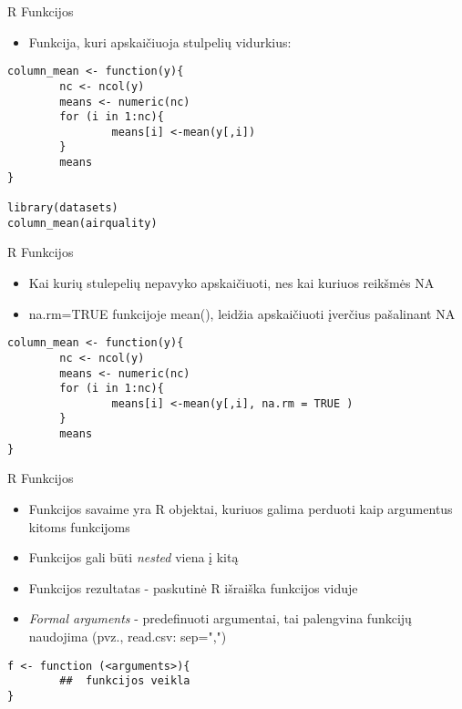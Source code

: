 \documentclass[11pt,xcolor=table]{beamer}
\begin{document}
\begin{frame}[fragile]{R Funkcijos}
\begin{itemize}
\item Funkcija, kuri apskaičiuoja stulpelių vidurkius:
\end{itemize}
\begin{lstlisting}
column_mean <- function(y){
        nc <- ncol(y)
        means <- numeric(nc)
        for (i in 1:nc){
                means[i] <-mean(y[,i])
        }
        means
}

library(datasets)
column_mean(airquality)
\end{lstlisting}
\end{frame}


\begin{frame}[fragile]{R Funkcijos}
\begin{itemize}
\item Kai kurių stulepelių nepavyko apskaičiuoti, nes kai kuriuos reikšmės NA
\item na.rm=TRUE funkcijoje mean(), leidžia apskaičiuoti įverčius pašalinant NA
\end{itemize}
\begin{lstlisting}
column_mean <- function(y){
        nc <- ncol(y)
        means <- numeric(nc)
        for (i in 1:nc){
                means[i] <-mean(y[,i], na.rm = TRUE )
        }
        means
}
\end{lstlisting}
\end{frame}


\begin{frame}[fragile]{R Funkcijos}
\begin{itemize}
\item Funkcijos savaime yra R objektai, kuriuos galima perduoti kaip argumentus kitoms funkcijoms
\item Funkcijos gali būti \textit{nested} viena į kitą
\item Funkcijos rezultatas - paskutinė R išraiška funkcijos viduje
\item \textit{Formal arguments} - predefinuoti argumentai, tai palengvina funkcijų naudojima (pvz., read.csv: sep=",")

\end{itemize}
\begin{lstlisting}
f <- function (<arguments>){
		##  funkcijos veikla
}
\end{lstlisting}
\end{frame}
\end{document}
